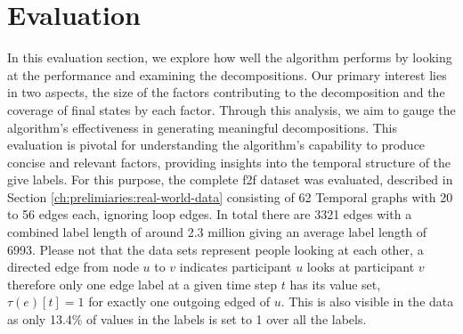 
\chapter{Evaluation}
\label{ch:Evaluation}

In this evaluation section, we explore how well the algorithm performs by looking at the performance and examining the decompositions.
Our primary interest lies in two aspects, the size of the factors contributing to the decomposition and the coverage of final states by each factor.
Through this analysis, we aim to gauge the algorithm's effectiveness in generating meaningful decompositions.
This evaluation is pivotal for understanding the algorithm's capability to produce concise and relevant factors, providing insights into the temporal structure of the give labels.
For this purpose, the complete f2f dataset was evaluated, described in Section \ref{ch:prelimiaries:real-world-data} consisting of 62 Temporal graphs with 20 to 56 edges each, ignoring loop edges.
In total there are 3321 edges with a combined label length of around 2.3 million giving an average label length of 6993.
Please not that the data sets represent people looking at each other, a directed edge from node $u$ to $v$ indicates participant $u$ looks at participant $v$ therefore only one edge label at a given time step $t$ has its value set, $\tau(e)[t] = 1$ for exactly one outgoing edged of $u$.
This is also visible in the data as only 13.4\% of values in the labels is set to 1 over all the labels.

